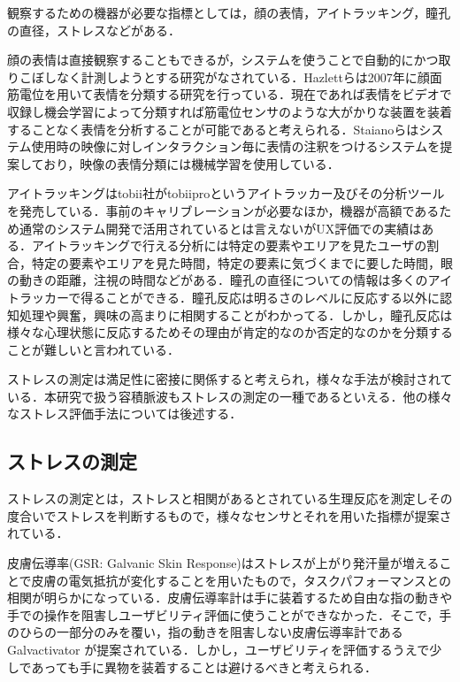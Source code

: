 観察するための機器が必要な指標としては，顔の表情，アイトラッキング，瞳孔の直径，ストレス\cite{tullis2014}などがある．

顔の表情は直接観察することもできるが，システムを使うことで自動的にかつ取りこぼしなく計測しようとする研究がなされている．Hazlettらは2007年に顔面筋電位を用いて表情を分類する研究を行っている\cite{faceemg}．現在であれば表情をビデオで収録し機会学習によって分類すれば筋電位センサのような大がかりな装置を装着することなく表情を分析することが可能であると考えられる．Staianoらはシステム使用時の映像に対しインタラクション毎に表情の注釈をつけるシステムを提案しており，映像の表情分類には機械学習を使用している\cite{uxmate}．

アイトラッキングはtobii社がtobiipro\cite{tobii}というアイトラッカー及びその分析ツールを発売している．事前のキャリブレーションが必要なほか，機器が高額であるため通常のシステム開発で活用されているとは言えないがUX評価での実績はある．アイトラッキングで行える分析には特定の要素やエリアを見たユーザの割合，特定の要素やエリアを見た時間，特定の要素に気づくまでに要した時間，眼の動きの距離，注視の時間などがある\cite{tullis2014}．瞳孔の直径についての情報は多くのアイトラッカーで得ることができる．瞳孔反応は明るさのレベルに反応する以外に認知処理や興奮，興味の高まりに相関することがわかってる．しかし，瞳孔反応は様々な心理状態に反応するためその理由が肯定的なのか否定的なのかを分類することが難しいと言われている\cite{tullis2014}．

ストレスの測定は満足性に密接に関係すると考えられ，様々な手法が検討されている．本研究で扱う容積脈波もストレスの測定の一種であるといえる．他の様々なストレス評価手法については後述する．

\subsection{ストレスの測定}

ストレスの測定とは，ストレスと相関があるとされている生理反応を測定しその度合いでストレスを判断するもので，様々なセンサとそれを用いた指標が提案されている．

皮膚伝導率(GSR: Galvanic Skin Response)はストレスが上がり発汗量が増えることで皮膚の電気抵抗が変化することを用いたもので，タスクパフォーマンスとの相関が明らかになっている\cite{lin2005}．皮膚伝導率計は手に装着するため自由な指の動きや手での操作を阻害しユーザビリティ評価に使うことができなかった．そこで，手のひらの一部分のみを覆い，指の動きを阻害しない皮膚伝導率計であるGalvactivator\cite{galvactivator} が提案されている．しかし，ユーザビリティを評価するうえで少しであっても手に異物を装着することは避けるべきと考えられる．


